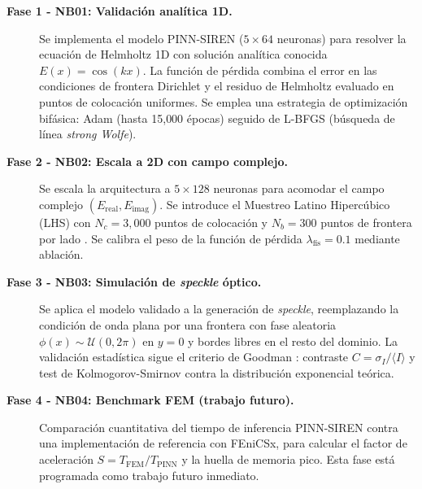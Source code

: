 \begin{description}
    \item[\textbf{Fase 1 - NB01: Validación analítica 1D.}]
    Se implementa el modelo PINN-SIREN ($5 \times 64$ neuronas) para resolver la
    ecuación de Helmholtz 1D con solución analítica conocida $E(x) = \cos(kx)$.
    La función de pérdida combina el error en las condiciones de frontera
    Dirichlet y el residuo de Helmholtz evaluado en puntos de colocación uniformes.
    Se emplea una estrategia de optimización bifásica: Adam (hasta 15{,}000 épocas)
    seguido de L-BFGS (búsqueda de línea \textit{strong Wolfe}).

    \item[\textbf{Fase 2 - NB02: Escala a 2D con campo complejo.}]
    Se escala la arquitectura a $5 \times 128$ neuronas para acomodar el campo
    complejo $(E_\text{real}, E_\text{imag})$. Se introduce el Muestreo Latino
    Hipercúbico (LHS) con $N_c = 3{,}000$ puntos de colocación y $N_b = 300$
    puntos de frontera por lado \parencite{mckay1979lhs}. Se calibra el peso de
    la función de pérdida $\lambda_\text{fís} = 0.1$ mediante ablación.

    \item[\textbf{Fase 3 - NB03: Simulación de \textit{speckle} óptico.}]
    Se aplica el modelo validado a la generación de \textit{speckle}, reemplazando
    la condición de onda plana por una frontera con fase aleatoria
    $\phi(x) \sim \mathcal{U}(0, 2\pi)$ en $y = 0$ y bordes libres en el
    resto del dominio. La validación estadística sigue el criterio de Goodman
    \parencite{goodman2007speckle}: contraste $C = \sigma_I / \langle I \rangle$
    y test de Kolmogorov-Smirnov contra la distribución exponencial teórica.

    \item[\textbf{Fase 4 - NB04: Benchmark FEM (trabajo futuro).}]
    Comparación cuantitativa del tiempo de inferencia PINN-SIREN contra una
    implementación de referencia con FEniCSx, para calcular el factor de
    aceleración $S = T_\text{FEM} / T_\text{PINN}$ y la huella de memoria pico.
    Esta fase está programada como trabajo futuro inmediato.
\end{description}
